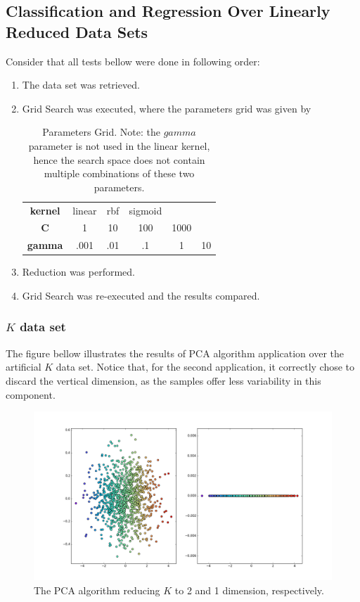 \documentclass[12pt]{article}
\begin{document}
\subsection{Classification and Regression Over Linearly Reduced Data Sets}

Consider that all tests bellow were done in following order:
\begin{enumerate}
	\item The data set was retrieved.
	\item Grid Search was executed, where the parameters grid was given by

	\begin{table}[H]
		\centering
		\begin{tabular}{ |*{5}{c} c| }
			\hline
			\textbf{kernel} & linear & rbf & sigmoid && \\
			\textbf{C} & 1 & 10 & 100 & 1000 & \\
			\textbf{gamma} & .001 & .01 & .1 & 1 & 10 \\\hline
		\end{tabular}

		\caption{Parameters Grid. Note: the $gamma$ parameter is not used in the linear kernel, hence the search space does not contain multiple combinations of these two parameters.}
	\end{table}

	\item Reduction was performed.
	\item Grid Search was re-executed and the results compared.

\end{enumerate}

\subsubsection{$K$ data set}

The figure bellow illustrates the results of PCA algorithm application over the artificial $K$ data set. Notice that, for the second application, it correctly chose to discard the vertical dimension, as the samples offer less variability in this component.

\begin{figure}[H]
	\centering
	\captionsetup{justification=centering}

	\includegraphics[width=.9\linewidth]{datasetrpca}
	\caption{The PCA algorithm reducing $K$ to 2 and 1 dimension, respectively.}
	\label{fig:datasetrpca}
\end{figure}
\end{document}
